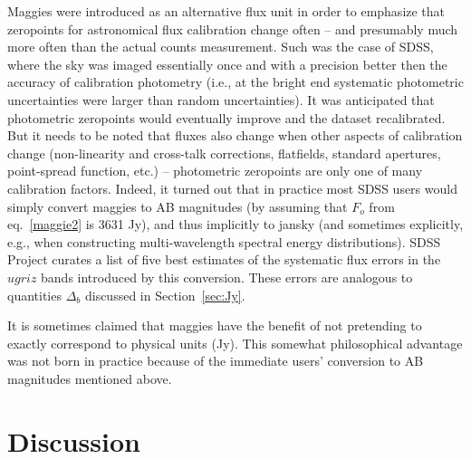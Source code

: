 \documentclass[PST,toc]{lsstdoc}
\begin{document}
Maggies were introduced as an alternative flux unit in order to emphasize
that zeropoints for astronomical flux calibration change often -- and
presumably much more often than the actual counts measurement. Such
was the case of SDSS, where the sky was imaged essentially once and with
a precision better then the accuracy of calibration photometry (i.e., at
the bright end systematic photometric uncertainties were larger than
random uncertainties). It was anticipated that photometric zeropoints
would eventually improve and the dataset recalibrated.  But it needs to
be noted that fluxes also change when other aspects of calibration change
(non-linearity and cross-talk corrections, flatfields, standard apertures,
point-spread function, etc.) -- photometric zeropoints are only one of
many calibration factors. Indeed, it turned out that in practice most
SDSS users would simply convert maggies to AB magnitudes (by assuming
that $F_o$ from eq.~\ref{maggie2} is 3631 Jy), and thus
implicitly to jansky (and sometimes explicitly, e.g., when constructing
multi-wavelength spectral energy distributions). SDSS Project curates a
list of five best estimates of the systematic flux errors in the $ugriz$
bands introduced by this conversion. These errors are analogous to
quantities $\Delta_b$ discussed in Section~\ref{sec:Jy}.

It is sometimes claimed that maggies have the benefit of not pretending
to exactly correspond to physical units (Jy). This somewhat philosophical
advantage was not born in practice because of the immediate users'
conversion to AB magnitudes mentioned above.


\section{Discussion}
\end{document}
